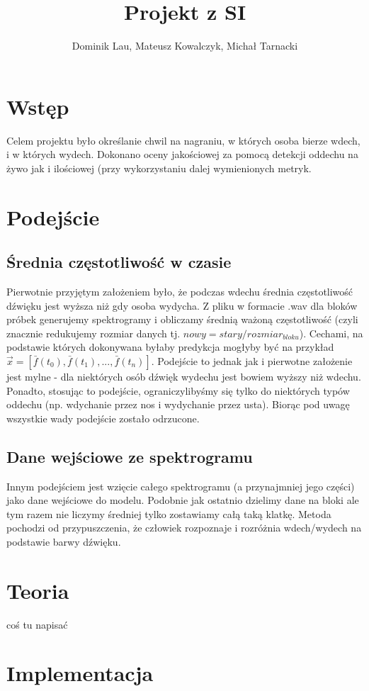 \documentclass{article}
\title{Projekt z SI}
\author{Dominik Lau, Mateusz Kowalczyk, Michał Tarnacki}
\begin{document}
\maketitle

\section{Wstęp}
Celem projektu było określanie chwil na nagraniu, w których osoba bierze wdech, i w których wydech. 
Dokonano oceny jakościowej za pomocą detekcji oddechu na żywo jak i ilościowej (przy wykorzystaniu
dalej wymienionych metryk.
\section{Podejście}
\subsection{Średnia częstotliwość w czasie}
Pierwotnie przyjętym założeniem było, że podczas wdechu średnia częstotliwość dźwięku jest wyższa niż
gdy osoba wydycha. Z pliku w formacie .wav dla bloków próbek generujemy spektrogramy i obliczamy
średnią ważoną częstotliwość (czyli znacznie redukujemy rozmiar danych tj. $nowy = stary/rozmiar_{bloku}$).
Cechami, na podstawie których
dokonywana byłaby predykcja mogłyby być na przykład $\vec{x} = [\bar{f}(t_0), \bar{f}(t_1), ..., \bar{f}(t_n)]$.
Podejście to jednak jak i pierwotne założenie jest mylne - dla niektórych osób 
dźwięk wydechu jest bowiem wyższy
niż wdechu. Ponadto, stosując to podejście, ograniczylibyśmy się tylko do niektórych typów oddechu (np. 
wdychanie przez nos i wydychanie przez usta).  Biorąc pod uwagę wszystkie wady podejście zostało odrzucone.
\subsection{Dane wejściowe ze spektrogramu}
Innym podejściem jest wzięcie całego spektrogramu (a przynajmniej jego części) jako dane wejściowe do 
modelu.  Podobnie jak ostatnio dzielimy dane na bloki ale tym razem nie liczymy średniej tylko zostawiamy
całą taką klatkę.
Metoda pochodzi od przypuszczenia, że człowiek rozpoznaje i rozróżnia wdech/wydech
na podstawie barwy dźwięku. 

\section{Teoria}
coś tu napisać


\section{Implementacja}
\end{document}
